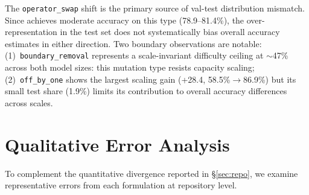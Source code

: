 \begin{table}[h]
\centering
\small
\caption{Repo-level mutation type distribution: validation vs.\ test set, with per-type \cls{} accuracy at two model sizes (seed 42). Shift = test\% $-$ val\%.}
\label{tab:mutation_distribution}
\setlength{\tabcolsep}{3pt}
\end{table}

The \texttt{operator\_swap} shift is the primary source of val-test distribution mismatch. Since \cls{} achieves moderate accuracy on this type (78.9--81.4\%), the over-representation in the test set does not systematically bias overall accuracy estimates in either direction. Two boundary observations are notable: (1)~\texttt{boundary\_removal} represents a scale-invariant difficulty ceiling at ${\sim}$47\% across both model sizes: this mutation type resists capacity scaling; (2)~\texttt{off\_by\_one} shows the largest scaling gain (+28.4\pp{}, 58.5\%$\to$86.9\%) but its small test share (1.9\%) limits its contribution to overall accuracy differences across scales.

\section{Qualitative Error Analysis}
\label{app:qualitative}

To complement the quantitative divergence reported in \S\ref{sec:repo}, we examine representative errors from each formulation at repository level.

